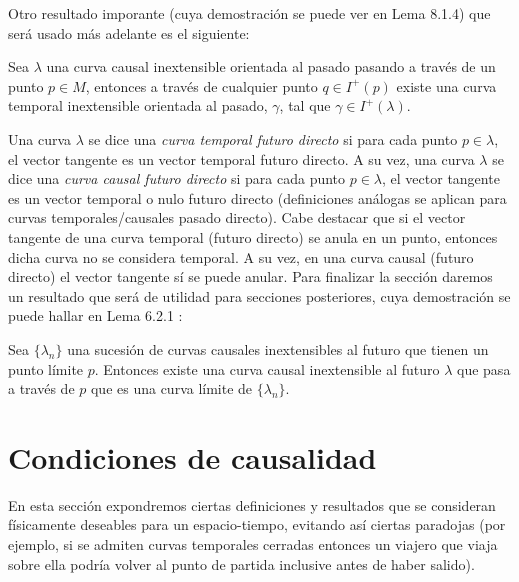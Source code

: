 Otro resultado imporante (cuya demostración se puede ver en \citep{1984ucp..book.....W} Lema 8.1.4) que será usado más adelante es el siguiente:

\begin{lemma}\label{existencia curva timelike}
Sea $\lambda$ una curva causal inextensible orientada al pasado pasando a través de un punto $p\in M$, entonces a través de cualquier punto $q\in I^+(p)$ existe una curva temporal inextensible orientada al pasado, $\gamma$, tal que $\gamma\in I^+(\lambda)$. 
\end{lemma}



Una curva $\lambda$ se dice una \textit{curva temporal futuro directo} si para cada punto $p\in \lambda$, el vector tangente es un vector temporal futuro directo. A su vez, una curva $\lambda$ se dice una \textit{curva causal futuro directo} si para cada punto $p\in \lambda$, el vector tangente es un vector temporal o nulo futuro directo (definiciones análogas se aplican para curvas temporales/causales pasado directo). Cabe destacar que si el vector tangente de una curva temporal (futuro directo) se anula en un punto, entonces dicha curva no se considera temporal. A su vez, en una curva causal (futuro directo) el vector tangente sí se puede anular. Para finalizar la sección daremos un resultado que será de utilidad para secciones posteriores, cuya demostración se puede hallar en Lema 6.2.1 \citep{1975lsss.book.....H}:

\begin{lemma}\label{existencia curva limite}
Sea $\{\lambda_n\}$ una sucesión de curvas causales inextensibles al futuro que tienen un punto límite $p$. Entonces existe una curva causal inextensible al futuro $\lambda$ que pasa a través de $p$ que es una curva límite de $\{\lambda_n\}$.
\end{lemma}










    
\section{Condiciones de causalidad}%

En esta sección expondremos ciertas definiciones y resultados que se consideran físicamente deseables para un espacio-tiempo, evitando así ciertas paradojas (por ejemplo, si se admiten curvas temporales cerradas entonces un viajero que viaja sobre ella podría volver al punto de partida inclusive antes de haber salido).

